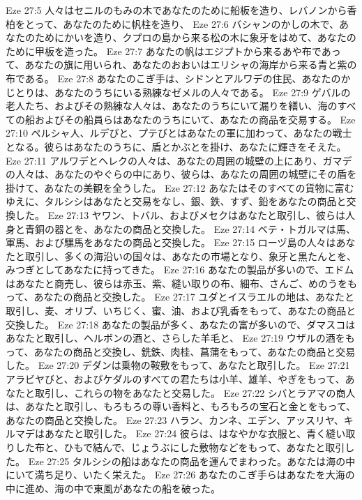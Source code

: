 Eze 27:5  人々はセニルのもみの木であなたのために船板を造り、レバノンから香柏をとって、あなたのために帆柱を造り、
Eze 27:6  バシャンのかしの木で、あなたのためにかいを造り、クプロの島から来る松の木に象牙をはめて、あなたのために甲板を造った。
Eze 27:7  あなたの帆はエジプトから来るあや布であって、あなたの旗に用いられ、あなたのおおいはエリシャの海岸から来る青と紫の布である。
Eze 27:8  あなたのこぎ手は、シドンとアルワデの住民、あなたのかじとりは、あなたのうちにいる熟練なゼメルの人々である。
Eze 27:9  ゲバルの老人たち、およびその熟練な人々は、あなたのうちにいて漏りを繕い、海のすべての船およびその船員らはあなたのうちにいて、あなたの商品を交易する。
Eze 27:10  ペルシャ人、ルデびと、プテびとはあなたの軍に加わって、あなたの戦士となる。彼らはあなたのうちに、盾とかぶとを掛け、あなたに輝きをそえた。
Eze 27:11  アルワデとヘレクの人々は、あなたの周囲の城壁の上にあり、ガマデの人々は、あなたのやぐらの中にあり、彼らは、あなたの周囲の城壁にその盾を掛けて、あなたの美観を全うした。
Eze 27:12  あなたはそのすべての貨物に富むゆえに、タルシシはあなたと交易をなし、銀、鉄、すず、鉛をあなたの商品と交換した。
Eze 27:13  ヤワン、トバル、およびメセクはあなたと取引し、彼らは人身と青銅の器とを、あなたの商品と交換した。
Eze 27:14  ベテ・トガルマは馬、軍馬、および騾馬をあなたの商品と交換した。
Eze 27:15  ローヅ島の人々はあなたと取引し、多くの海沿いの国々は、あなたの市場となり、象牙と黒たんとを、みつぎとしてあなたに持ってきた。
Eze 27:16  あなたの製品が多いので、エドムはあなたと商売し、彼らは赤玉、紫、縫い取りの布、細布、さんご、めのうをもって、あなたの商品と交換した。
Eze 27:17  ユダとイスラエルの地は、あなたと取引し、麦、オリブ、いちじく、蜜、油、および乳香をもって、あなたの商品と交換した。
Eze 27:18  あなたの製品が多く、あなたの富が多いので、ダマスコはあなたと取引し、ヘルボンの酒と、さらした羊毛と、
Eze 27:19  ウザルの酒をもって、あなたの商品と交換し、銑鉄、肉桂、菖蒲をもって、あなたの商品と交易した。
Eze 27:20  デダンは乗物の鞍敷をもって、あなたと取引した。
Eze 27:21  アラビヤびと、およびケダルのすべての君たちは小羊、雄羊、やぎをもって、あなたと取引し、これらの物をあなたと交易した。
Eze 27:22  シバとラアマの商人は、あなたと取引し、もろもろの尊い香料と、もろもろの宝石と金とをもって、あなたの商品と交換した。
Eze 27:23  ハラン、カンネ、エデン、アッスリヤ、キルマデはあなたと取引した。
Eze 27:24  彼らは、はなやかな衣服と、青く縫い取りした布と、ひもで結んで、じょうぶにした敷物などをもって、あなたと取引した。
Eze 27:25  タルシシの船はあなたの商品を運んでまわった。あなたは海の中にいて満ち足り、いたく栄えた。
Eze 27:26  あなたのこぎ手らはあなたを大海の中に進め、海の中で東風があなたの船を破った。
